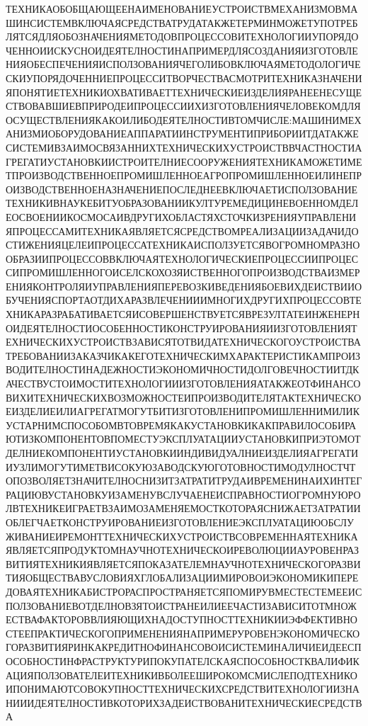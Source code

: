 \documentclass[a4paper, 14pt]{extarticle}
\begin{document}
ТЕХНИКАОБОБЩАЮЩЕЕНАИМЕНОВАНИЕУСТРОИСТВМЕХАНИЗМОВМАШИНСИСТЕМВКЛЮЧАЯСРЕДСТВАТРУДАТАКЖЕТЕРМИНМОЖЕТУПОТРЕБЛЯТСЯДЛЯОБОЗНАЧЕНИЯМЕТОДОВПРОЦЕССОВИТЕХНОЛОГИИУПОРЯДОЧЕННОИИСКУСНОИДЕЯТЕЛНОСТИНАПРИМЕРДЛЯСОЗДАНИЯИЗГОТОВЛЕНИЯОБЕСПЕЧЕНИЯИСПОЛЗОВАНИЯЧЕГОЛИБОВКЛЮЧАЯМЕТОДОЛОГИЧЕСКИУПОРЯДОЧЕННИЕПРОЦЕССИТВОРЧЕСТВАСМОТРИТЕХНИКАЗНАЧЕНИЯПОНЯТИЕТЕХНИКИОХВАТИВАЕТТЕХНИЧЕСКИЕИЗДЕЛИЯРАНЕЕНЕСУЩЕСТВОВАВШИЕВПРИРОДЕИПРОЦЕССИИХИЗГОТОВЛЕНИЯЧЕЛОВЕКОМДЛЯОСУЩЕСТВЛЕНИЯКАКОИЛИБОДЕЯТЕЛНОСТИВТОМЧИСЛЕ:МАШИНИМЕХАНИЗМИОБОРУДОВАНИЕАППАРАТИИНСТРУМЕНТИПРИБОРИИТДАТАКЖЕСИСТЕМИВЗАИМОСВЯЗАННИХТЕХНИЧЕСКИХУСТРОИСТВВЧАСТНОСТИАГРЕГАТИУСТАНОВКИИСТРОИТЕЛНИЕСООРУЖЕНИЯТЕХНИКАМОЖЕТИМЕТПРОИЗВОДСТВЕННОЕПРОМИШЛЕННОЕАГРОПРОМИШЛЕННОЕИЛИНЕПРОИЗВОДСТВЕННОЕНАЗНАЧЕНИЕПОСЛЕДНЕЕВКЛЮЧАЕТИСПОЛЗОВАНИЕТЕХНИКИВНАУКЕБИТУОБРАЗОВАНИИКУЛТУРЕМЕДИЦИНЕВОЕННОМДЕЛЕОСВОЕНИИКОСМОСАИВДРУГИХОБЛАСТЯХСТОЧКИЗРЕНИЯУПРАВЛЕНИЯПРОЦЕССАМИТЕХНИКАЯВЛЯЕТСЯСРЕДСТВОМРЕАЛИЗАЦИИЗАДАЧИДОСТИЖЕНИЯЦЕЛЕИПРОЦЕССАТЕХНИКАИСПОЛЗУЕТСЯВОГРОМНОМРАЗНООБРАЗИИПРОЦЕССОВВКЛЮЧАЯТЕХНОЛОГИЧЕСКИЕПРОЦЕССИИПРОЦЕССИПРОМИШЛЕННОГОИСЕЛСКОХОЗЯИСТВЕННОГОПРОИЗВОДСТВАИЗМЕРЕНИЯКОНТРОЛЯИУПРАВЛЕНИЯПЕРЕВОЗКИВЕДЕНИЯБОЕВИХДЕИСТВИИОБУЧЕНИЯСПОРТАОТДИХАРАЗВЛЕЧЕНИИИМНОГИХДРУГИХПРОЦЕССОВТЕХНИКАРАЗРАБАТИВАЕТСЯИСОВЕРШЕНСТВУЕТСЯВРЕЗУЛТАТЕИНЖЕНЕРНОИДЕЯТЕЛНОСТИОСОБЕННОСТИКОНСТРУИРОВАНИЯИИЗГОТОВЛЕНИЯТЕХНИЧЕСКИХУСТРОИСТВЗАВИСЯТОТВИДАТЕХНИЧЕСКОГОУСТРОИСТВАТРЕБОВАНИИЗАКАЗЧИКАКЕГОТЕХНИЧЕСКИМХАРАКТЕРИСТИКАМПРОИЗВОДИТЕЛНОСТИНАДЕЖНОСТИЭКОНОМИЧНОСТИДОЛГОВЕЧНОСТИИТДКАЧЕСТВУСТОИМОСТИТЕХНОЛОГИИИЗГОТОВЛЕНИЯАТАКЖЕОТФИНАНСОВИХИТЕХНИЧЕСКИХВОЗМОЖНОСТЕИПРОИЗВОДИТЕЛЯТАКТЕХНИЧЕСКОЕИЗДЕЛИЕИЛИАГРЕГАТМОГУТБИТИЗГОТОВЛЕНИПРОМИШЛЕННИМИЛИКУСТАРНИМСПОСОБОМВТОВРЕМЯКАКУСТАНОВКИКАКПРАВИЛОСОБИРАЮТИЗКОМПОНЕНТОВПОМЕСТУЭКСПЛУАТАЦИИУСТАНОВКИПРИЭТОМОТДЕЛНИЕКОМПОНЕНТИУСТАНОВКИИНДИВИДУАЛНИЕИЗДЕЛИЯАГРЕГАТИИУЗЛИМОГУТИМЕТВИСОКУЮЗАВОДСКУЮГОТОВНОСТИМОДУЛНОСТЧТОПОЗВОЛЯЕТЗНАЧИТЕЛНОСНИЗИТЗАТРАТИТРУДАИВРЕМЕНИНАИХИНТЕГРАЦИЮВУСТАНОВКУИЗАМЕНУВСЛУЧАЕНЕИСПРАВНОСТИОГРОМНУЮРОЛВТЕХНИКЕИГРАЕТВЗАИМОЗАМЕНЯЕМОСТКОТОРАЯСНИЖАЕТЗАТРАТИИОБЛЕГЧАЕТКОНСТРУИРОВАНИЕИЗГОТОВЛЕНИЕЭКСПЛУАТАЦИЮОБСЛУЖИВАНИЕИРЕМОНТТЕХНИЧЕСКИХУСТРОИСТВСОВРЕМЕННАЯТЕХНИКАЯВЛЯЕТСЯПРОДУКТОМНАУЧНОТЕХНИЧЕСКОИРЕВОЛЮЦИИАУРОВЕНРАЗВИТИЯТЕХНИКИЯВЛЯЕТСЯПОКАЗАТЕЛЕМНАУЧНОТЕХНИЧЕСКОГОРАЗВИТИЯОБЩЕСТВАВУСЛОВИЯХГЛОБАЛИЗАЦИИМИРОВОИЭКОНОМИКИПЕРЕДОВАЯТЕХНИКАБИСТРОРАСПРОСТРАНЯЕТСЯПОМИРУВМЕСТЕСТЕМЕЕИСПОЛЗОВАНИЕВОТДЕЛНОВЗЯТОИСТРАНЕИЛИЕЕЧАСТИЗАВИСИТОТМНОЖЕСТВАФАКТОРОВВЛИЯЮЩИХНАДОСТУПНОСТТЕХНИКИИЭФФЕКТИВНОСТЕЕПРАКТИЧЕСКОГОПРИМЕНЕНИЯНАПРИМЕРУРОВЕНЭКОНОМИЧЕСКОГОРАЗВИТИЯРИНКАКРЕДИТНОФИНАНСОВОИСИСТЕМИНАЛИЧИЕИДЕЕСПОСОБНОСТИНФРАСТРУКТУРИПОКУПАТЕЛСКАЯСПОСОБНОСТКВАЛИФИКАЦИЯПОЛЗОВАТЕЛЕИТЕХНИКИВБОЛЕЕШИРОКОМСМИСЛЕПОДТЕХНИКОИПОНИМАЮТСОВОКУПНОСТТЕХНИЧЕСКИХСРЕДСТВИТЕХНОЛОГИИЗНАНИИИДЕЯТЕЛНОСТИВКОТОРИХЗАДЕИСТВОВАНИТЕХНИЧЕСКИЕСРЕДСТВА
\end{document}
